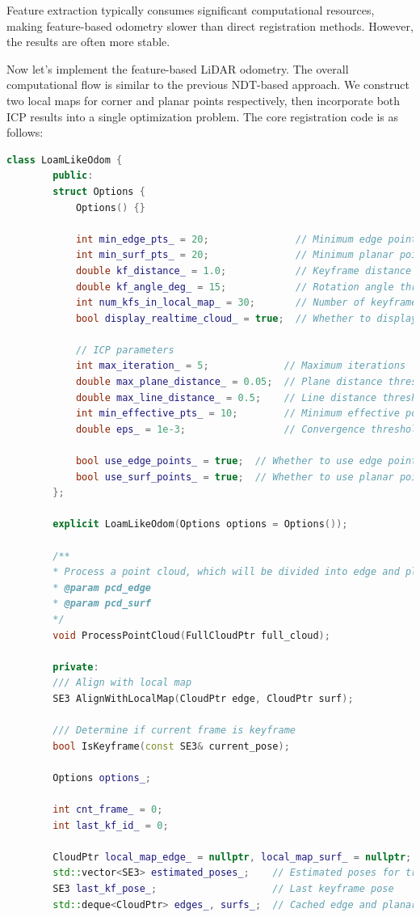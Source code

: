 Feature extraction typically consumes significant computational resources, making feature-based odometry slower than direct registration methods. However, the results are often more stable.

Now let's implement the feature-based LiDAR odometry. The overall computational flow is similar to the previous NDT-based approach. We construct two local maps for corner and planar points respectively, then incorporate both ICP results into a single optimization problem. The core registration code is as follows:

\begin{lstlisting}[language=c++,caption=src/ch7/loam-like/loam\_like\_odom.cc]
	class LoamLikeOdom {
		public:
		struct Options {
			Options() {}
			
			int min_edge_pts_ = 20;               // Minimum edge points
			int min_surf_pts_ = 20;               // Minimum planar points
			double kf_distance_ = 1.0;            // Keyframe distance threshold
			double kf_angle_deg_ = 15;            // Rotation angle threshold
			int num_kfs_in_local_map_ = 30;       // Number of keyframes in local map
			bool display_realtime_cloud_ = true;  // Whether to display real-time cloud
			
			// ICP parameters
			int max_iteration_ = 5;             // Maximum iterations
			double max_plane_distance_ = 0.05;  // Plane distance threshold
			double max_line_distance_ = 0.5;    // Line distance threshold
			int min_effective_pts_ = 10;        // Minimum effective points
			double eps_ = 1e-3;                 // Convergence threshold
			
			bool use_edge_points_ = true;  // Whether to use edge points
			bool use_surf_points_ = true;  // Whether to use planar points
		};
		
		explicit LoamLikeOdom(Options options = Options());
		
		/**
		* Process a point cloud, which will be divided into edge and planar points
		* @param pcd_edge
		* @param pcd_surf
		*/
		void ProcessPointCloud(FullCloudPtr full_cloud);
		
		private:
		/// Align with local map
		SE3 AlignWithLocalMap(CloudPtr edge, CloudPtr surf);
		
		/// Determine if current frame is keyframe
		bool IsKeyframe(const SE3& current_pose);
		
		Options options_;
		
		int cnt_frame_ = 0;
		int last_kf_id_ = 0;
		
		CloudPtr local_map_edge_ = nullptr, local_map_surf_ = nullptr;  // Local maps
		std::vector<SE3> estimated_poses_;    // Estimated poses for trajectory
		SE3 last_kf_pose_;                    // Last keyframe pose
		std::deque<CloudPtr> edges_, surfs_;  // Cached edge and planar points
		

\end{lstlisting}
